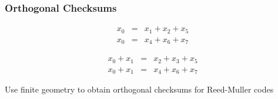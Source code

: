 \documentclass[xcolor=xvgnames]{beamer}
\newcommand{\rem}{Reed-Muller}
\begin{document}

\begin{frame}
 \frametitle{Orthogonal Checksums}

\begin{example}
\begin{eqnarray*}
 x_0 &=& x_1 + x_2 + x_5  \\
 x_0 &=& x_4 + x_6 + x_7  
\end{eqnarray*}
\end{example}

\begin{example}
\begin{eqnarray*}
 x_0 + x_1 &=& x_2 + x_3 + x_5  \\
 x_0 + x_1 &=& x_4 + x_6 + x_7  
\end{eqnarray*}
\end{example}

\alert{Use finite geometry to obtain orthogonal checksums for \rem{} codes}

\end{frame}
\end{document}
